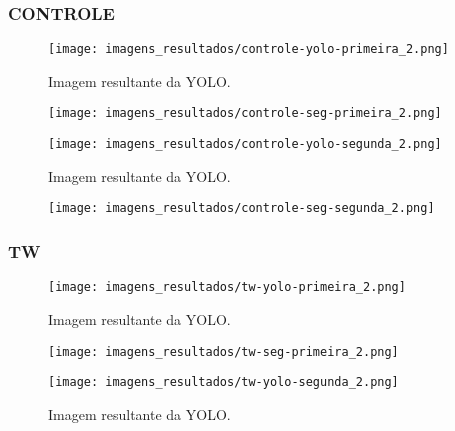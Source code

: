 \subsubsection{CONTROLE}

\begin{figure}[!h]
    \centering
    \texttt{[image: imagens\_resultados/controle-yolo-primeira\_2.png]}
    \caption{Imagem resultante da YOLO.}
    \label{fig:controle-yolo-primeira_2}
\end{figure}

\begin{figure}[!h]
    \centering
    \texttt{[image: imagens\_resultados/controle-seg-primeira\_2.png]}
    \caption{}
    \label{fig:controle-seg-primeira_2}
\end{figure}

\begin{figure}[!h]
    \centering
    \texttt{[image: imagens\_resultados/controle-yolo-segunda\_2.png]}
    \caption{Imagem resultante da YOLO.}
    \label{fig:controle-yolo-segunda_2}
\end{figure}

\begin{figure}[!h]
    \centering
    \texttt{[image: imagens\_resultados/controle-seg-segunda\_2.png]}
    \caption{}
    \label{fig:controle-seg-segunda_2}
\end{figure}

\subsubsection{TW}

\begin{figure}[!h]
    \centering
    \texttt{[image: imagens\_resultados/tw-yolo-primeira\_2.png]}
    \caption{Imagem resultante da YOLO.}
    \label{fig:tw-yolo-primeira_2}
\end{figure}

\begin{figure}[!h]
    \centering
    \texttt{[image: imagens\_resultados/tw-seg-primeira\_2.png]}
    \caption{}
    \label{fig:tw-seg-primeira_2}
\end{figure}

\begin{figure}[!h]
    \centering
    \texttt{[image: imagens\_resultados/tw-yolo-segunda\_2.png]}
    \caption{Imagem resultante da YOLO.}
    \label{fig:tw-yolo-segunda_2}
\end{figure}

